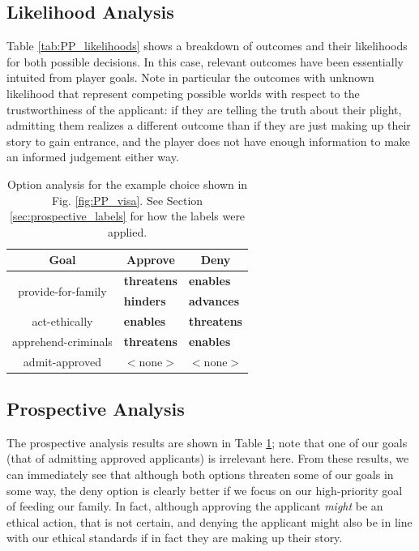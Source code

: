 \documentclass[arts,article,submit,moreauthors,pdftex,10pt,a4paper]{Definitions/mdpi}
\newcommand{\enables}{\textbf{\color{enables}enables}}
\newcommand{\advances}{\textbf{\color{advances}advances}}
\newcommand{\threatens}{\textbf{\color{threatens}threatens}}
\newcommand{\hinders}{\textbf{\color{hinders}hinders}}
\begin{document}
\subsection{Likelihood Analysis}

Table \ref{tab:PP_likelihoods} shows a breakdown of outcomes and their likelihoods for both possible decisions.
%
In this case, relevant outcomes have been essentially intuited from player goals.
%
Note in particular the outcomes with unknown likelihood that represent competing possible worlds with respect to the trustworthiness of the applicant: if they are telling the truth about their plight, admitting them realizes a different outcome than if they are just making up their story to gain entrance, and the player does not have enough information to make an informed judgement either way.


\begin{table}[H]
\centering
\begin{tabular}{c l l}
  \toprule
  \textbf{Goal} & \multicolumn{1}{c}{\textbf{Approve}} & \multicolumn{1}{c}{\textbf{Deny}} \\
  \midrule
  \multirow{2}{9em}{\centering provide-for-family} & \threatens{} & \enables{} \\
                                        & \hinders{} & \advances{} \\
  \midrule
  act-ethically & \enables{} & \threatens{} \\
  \midrule
  apprehend-criminals & \threatens{} & \enables{} \\
  \midrule
  admit-approved & $<$none$>$ & $<$none$>$ \\
  \bottomrule
\end{tabular}
  \caption[\emph{Papers Please} option analysis]{Option analysis for the example choice shown in Fig. \ref{fig:PP_visa}. See Section \ref{sec:prospective_labels} for how the labels were applied.}
\label{tab:PP_options}
\end{table}

\subsection{Prospective Analysis}

The prospective analysis results are shown in Table \ref{tab:PP_options}; note that one of our goals (that of admitting approved applicants) is irrelevant here.
%
From these results, we can immediately see that although both options threaten some of our goals in some way, the deny option is clearly better if we focus on our high-priority goal of feeding our family.
%
In fact, although approving the applicant \emph{might} be an ethical action, that is not certain, and denying the applicant might also be in line with our ethical standards if in fact they are making up their story.
\end{document}
